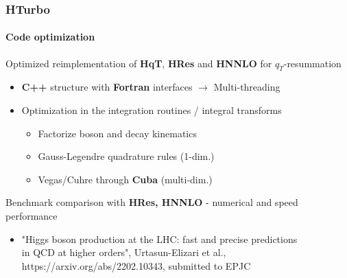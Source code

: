\documentclass[aspectratio=43]{beamer}
\begin{document}
\begin{frame}

	\frametitle{HTurbo}
	\framesubtitle{Code optimization}
	
	\footnotesize
	
	Optimized reimplementation of \textbf{HqT}, \textbf{HRes} and \textbf{HNNLO} for $q_{T}$-resummation
	
	\vspace{0.2 cm}
		
	\begin{itemize}
		\item \textbf{C++} structure with \textbf{Fortran} interfaces $\rightarrow$ Multi-threading
		\item Optimization in the integration routines / integral transforms 
		\begin{itemize}
			\item Factorize boson and decay kinematics
			\item Gauss-Legendre quadrature rules (1-dim.)
			\item Vegas/Cuhre through \textbf{Cuba} (multi-dim.)
		\end{itemize}
	\end{itemize}
	
	\vspace{0.5cm}
	
	Benchmark comparison with \textbf{HRes, HNNLO} - numerical and speed performance \\
	\begin{itemize}
		\item {\color{blue}"Higgs boson production at the LHC:
			fast and precise predictions \\ in QCD at higher orders", Urtasun-Elizari et al.,\\ https://arxiv.org/abs/2202.10343, submitted to EPJC}
	\end{itemize}
	
\end{frame}
\end{document}
